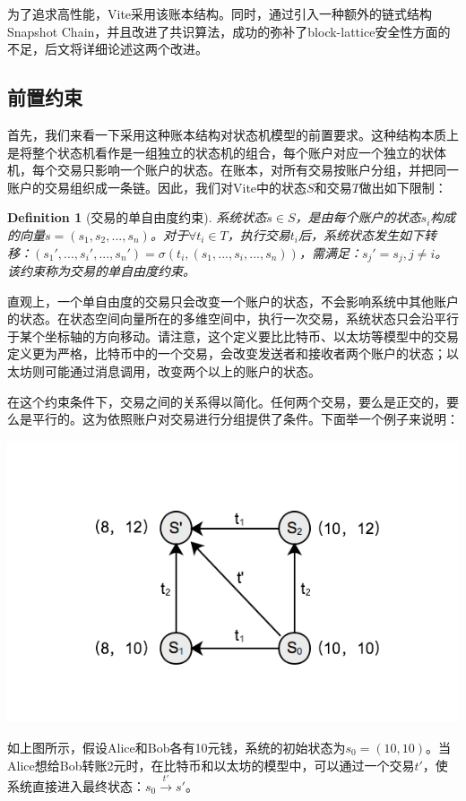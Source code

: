 \documentclass[UTF8,nofonts]{ctexart}
\newtheorem{definition}{Definition}[section]
\begin{document}
\begin{multicols}{2}
为了追求高性能，Vite采用该账本结构。同时，通过引入一种额外的链式结构Snapshot Chain，并且改进了共识算法，成功的弥补了block-lattice安全性方面的不足，后文将详细论述这两个改进。

\subsection{前置约束}
首先，我们来看一下采用这种账本结构对状态机模型的前置要求。这种结构本质上是将整个状态机看作是一组独立的状态机的组合，每个账户对应一个独立的状体机，每个交易只影响一个账户的状态。在账本，对所有交易按账户分组，并把同一账户的交易组织成一条链。因此，我们对Vite中的状态$S$和交易$T$做出如下限制：

\begin{definition}[交易的单自由度约束]
系统状态$s \in S$，是由每个账户的状态$s_{i}$构成的向量$s=(s_{1}, s_{2},...,s_{n})$。对于$\forall t_{i} \in T$，执行交易$t_{i}$后，系统状态发生如下转移：$({s_{1}}',..., {s_{i}}',...,{s_{n}}') = \sigma(t_{i}, (s_{1},..., s_{i},...,s_{n}))$，需满足：${s_{j}}'=s_{j} , j \neq i$。该约束称为交易的单自由度约束。
\end{definition}

直观上，一个单自由度的交易只会改变一个账户的状态，不会影响系统中其他账户的状态。在状态空间向量所在的多维空间中，执行一次交易，系统状态只会沿平行于某个坐标轴的方向移动。请注意，这个定义要比比特币、以太坊等模型中的交易定义更为严格，比特币中的一个交易，会改变发送者和接收者两个账户的状态；以太坊则可能通过消息调用，改变两个以上的账户的状态。

在这个约束条件下，交易之间的关系得以简化。任何两个交易，要么是正交的，要么是平行的。这为依照账户对交易进行分组提供了条件。下面举一个例子来说明：

\includegraphics[width=.8\linewidth]{image/tx-deg-of-free.png}

如上图所示，假设Alice和Bob各有10元钱，系统的初始状态为$s_{0} = (10, 10)$。当Alice想给Bob转账2元时，在比特币和以太坊的模型中，可以通过一个交易${t}'$，使系统直接进入最终状态：$s_{0} \overset{{t}'}{\rightarrow}{s}'$。


\end{multicols}
\end{document}
